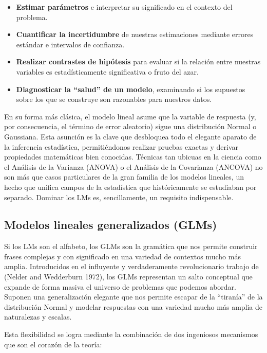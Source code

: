 \documentclass[
  letterpaper,
  DIV=11,
  numbers=noendperiod]{scrreprt}
\providecommand{\tightlist}{%
  \setlength{\itemsep}{0pt}\setlength{\parskip}{0pt}}
\begin{document}
\begin{itemize}
\tightlist
\item
  \textbf{Estimar parámetros} e interpretar su significado en el
  contexto del problema.
\item
  \textbf{Cuantificar la incertidumbre} de nuestras estimaciones
  mediante errores estándar e intervalos de confianza.
\item
  \textbf{Realizar contrastes de hipótesis} para evaluar si la relación
  entre nuestras variables es estadísticamente significativa o fruto del
  azar.
\item
  \textbf{Diagnosticar la ``salud'' de un modelo}, examinando si los
  supuestos sobre los que se construye son razonables para nuestros
  datos.
\end{itemize}

En su forma más clásica, el modelo lineal asume que la variable de
respuesta (y, por consecuencia, el término de error aleatorio) sigue una
distribución Normal o Gaussiana. Esta asunción es la clave que
desbloquea todo el elegante aparato de la inferencia estadística,
permitiéndonos realizar pruebas exactas y derivar propiedades
matemáticas bien conocidas. Técnicas tan ubicuas en la ciencia como el
Análisis de la Varianza (ANOVA) o el Análisis de la Covarianza (ANCOVA)
no son más que casos particulares de la gran familia de los modelos
lineales, un hecho que unifica campos de la estadística que
históricamente se estudiaban por separado. Dominar los LMs es,
sencillamente, un requisito indispensable.

\subsection{Modelos lineales generalizados
(GLMs)}\label{modelos-lineales-generalizados-glms}

Si los LMs son el alfabeto, los GLMs son la gramática que nos permite
construir frases complejas y con significado en una variedad de
contextos mucho más amplia. Introducidos en el influyente y
verdaderamente revolucionario trabajo de (Nelder and Wedderburn 1972),
los GLMs representan un salto conceptual que expande de forma masiva el
universo de problemas que podemos abordar. Suponen una generalización
elegante que nos permite escapar de la ``tiranía'' de la distribución
Normal y modelar respuestas con una variedad mucho más amplia de
naturalezas y escalas.

Esta flexibilidad se logra mediante la combinación de dos ingeniosos
mecanismos que son el corazón de la teoría:
\end{document}
